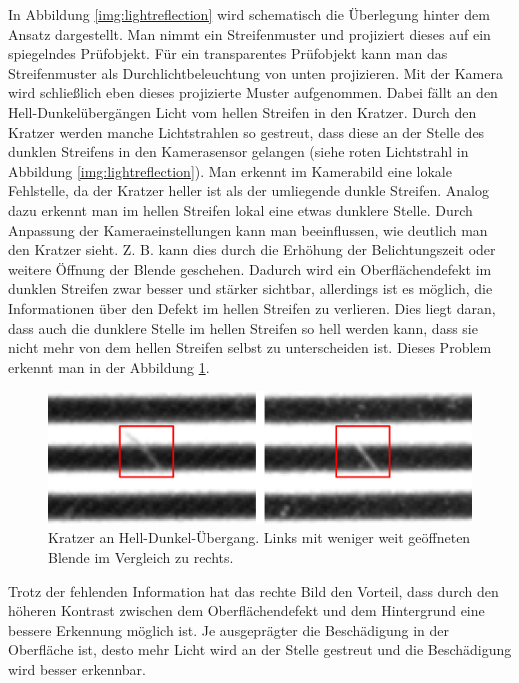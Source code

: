 \noindent
In Abbildung \ref{img:lightreflection} wird schematisch die Überlegung hinter dem Ansatz dargestellt.
Man nimmt ein Streifenmuster und projiziert dieses auf ein spiegelndes Prüfobjekt.
Für ein transparentes Prüfobjekt kann man das Streifenmuster als Durchlichtbeleuchtung von unten projizieren.
Mit der Kamera wird schließlich eben dieses projizierte Muster aufgenommen.
Dabei fällt an den Hell-Dunkelübergängen Licht vom hellen Streifen in den Kratzer.
Durch den Kratzer werden manche Lichtstrahlen so gestreut, dass diese an der Stelle des dunklen Streifens in den Kamerasensor gelangen (siehe roten Lichtstrahl in Abbildung \ref{img:lightreflection}).
Man erkennt im Kamerabild eine lokale Fehlstelle, da der Kratzer heller ist als der umliegende dunkle Streifen.
Analog dazu erkennt man im hellen Streifen lokal eine etwas dunklere Stelle.
Durch Anpassung der Kameraeinstellungen kann man beeinflussen, wie deutlich man den Kratzer sieht.
Z. B. kann dies durch die Erhöhung der Belichtungszeit oder weitere Öffnung der Blende geschehen.
Dadurch wird ein Oberflächendefekt im dunklen Streifen zwar besser und stärker sichtbar, allerdings ist es möglich, die Informationen über den Defekt im hellen Streifen zu verlieren.
Dies liegt daran, dass auch die dunklere Stelle im hellen Streifen so hell werden kann, dass sie nicht mehr von dem hellen Streifen selbst zu unterscheiden ist.
Dieses Problem erkennt man in der Abbildung \ref{img:scratches}.

\begin{figure}[H]
	\centering
	\includegraphics[width=\textwidth]{03_sichtpruefungDurchLichtstreuung/verfahren/figures/visibleScratch}
	\caption[Kratzer]{Kratzer an Hell-Dunkel-Übergang. Links mit weniger weit geöffneten Blende im Vergleich zu rechts.}
	\label{img:scratches}
\end{figure}

\noindent
Trotz der fehlenden Information hat das rechte Bild den Vorteil, dass durch den höheren Kontrast zwischen dem Oberflächendefekt und dem Hintergrund eine bessere Erkennung möglich ist.
Je ausgeprägter die Beschädigung in der Oberfläche ist, desto mehr Licht wird an der Stelle gestreut und die Beschädigung wird besser erkennbar.

